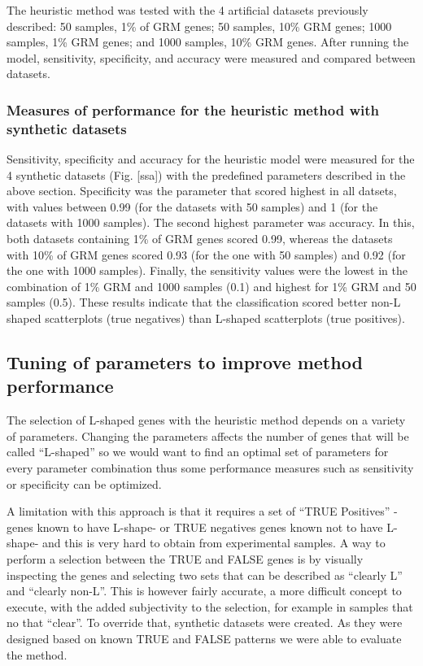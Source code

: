 \documentclass[10pt,letterpaper]{article}
\begin{document}
The heuristic method was tested with the 4 artificial datasets
previously described: 50 samples, 1\% of GRM genes; 50 samples, 10\% GRM
genes; 1000 samples, 1\% GRM genes; and 1000 samples, 10\% GRM genes.
After running the model, sensitivity, specificity, and accuracy were
measured and compared between datasets.

\hypertarget{measures-of-performance-for-the-heuristic-method-with-synthetic-datasets}{%
\subsubsection{Measures of performance for the heuristic method with
synthetic
datasets}\label{measures-of-performance-for-the-heuristic-method-with-synthetic-datasets}}

Sensitivity, specificity and accuracy for the heuristic model were
measured for the 4 synthetic datasets (Fig. {[}ssa{]}) with the
predefined parameters described in the above section. Specificity was
the parameter that scored highest in all datsets, with values between
0.99 (for the datasets with 50 samples) and 1 (for the datasets with
1000 samples). The second highest parameter was accuracy. In this, both
datasets containing 1\% of GRM genes scored 0.99, whereas the datasets
with 10\% of GRM genes scored 0.93 (for the one with 50 samples) and
0.92 (for the one with 1000 samples). Finally, the sensitivity values
were the lowest in the combination of 1\% GRM and 1000 samples (0.1) and
highest for 1\% GRM and 50 samples (0.5). These results indicate that
the classification scored better non-L shaped scatterplots (true
negatives) than L-shaped scatterplots (true positives).

\hypertarget{tuning-of-parameters-to-improve-method-performance}{%
\subsection{Tuning of parameters to improve method
performance}\label{tuning-of-parameters-to-improve-method-performance}}

The selection of L-shaped genes with the heuristic method depends on a
variety of parameters. Changing the parameters affects the number of
genes that will be called ``L-shaped'' so we would want to find an
optimal set of parameters for every parameter combination thus some
performance measures such as sensitivity or specificity can be
optimized.

A limitation with this approach is that it requires a set of ``TRUE
Positives'' -genes known to have L-shape- or TRUE negatives genes known
not to have L-shape- and this is very hard to obtain from experimental
samples. A way to perform a selection between the TRUE and FALSE genes
is by visually inspecting the genes and selecting two sets that can be
described as ``clearly L'' and ``clearly non-L''. This is however fairly
accurate, a more difficult concept to execute, with the added
subjectivity to the selection, for example in samples that no that
``clear''. To override that, synthetic datasets were created. As they
were designed based on known TRUE and FALSE patterns we were able to
evaluate the method.
\end{document}
